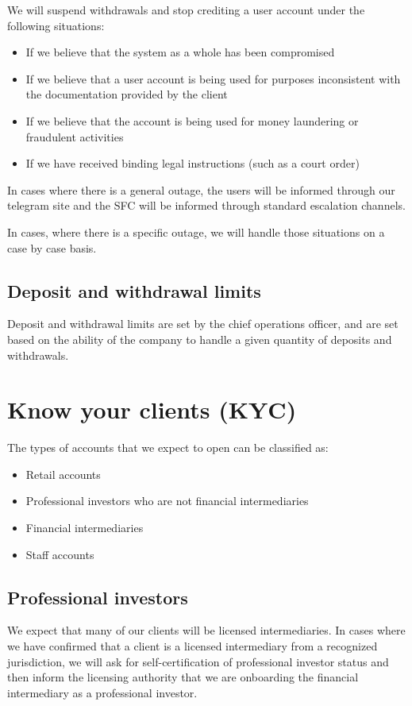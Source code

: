 We will suspend withdrawals and stop crediting a user account under
the following situations:
\begin{itemize}
\item If we believe that the system as a whole has been compromised
\item If we believe that a user account is being used for purposes
  inconsistent with the documentation provided by the client
\item If we believe that the account is being used for money
  laundering or fraudulent activities
\item If we have received binding legal instructions (such as a court order)
\end{itemize}

In cases where there is a general outage, the users will be informed
through our telegram site and the SFC will be informed through
standard escalation channels.

In cases, where there is a specific outage, we will handle those
situations on a case by case basis.

\subsection{Deposit and withdrawal limits}
Deposit and withdrawal limits are set by the chief operations officer,
and are set based on the ability of the company to handle a given
quantity of deposits and withdrawals.

\section{Know your clients (KYC)}

The types of accounts that we expect to open can be classified as:

\begin{itemize}
\item Retail accounts
\item Professional investors who are not financial intermediaries
\item Financial intermediaries
\item Staff accounts
  \end{itemize}

\subsection{Professional investors}
We expect that many of our clients will be licensed intermediaries.
In cases where we have confirmed that a client is a licensed
intermediary from a recognized jurisdiction, we will ask for
self-certification of professional investor status and then inform the
licensing authority that we are onboarding the financial intermediary
as a professional investor.

